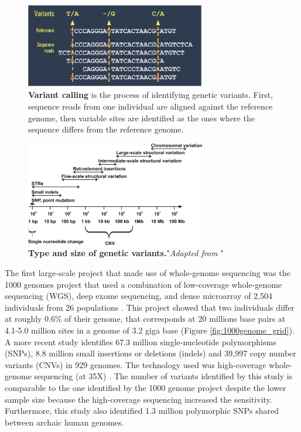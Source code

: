 \begin{figure}[H]
\centering
\includegraphics[width=0.7\textwidth]{fig/variantCalling.png}
\decoRule
\caption{\textbf{Variant calling} is the process of identifying genetic variants. First, sequence reads from one individual are aligned against the reference genome, then variable sites are identified as the ones where the sequence differs from the reference genome.} 
\label{fig:variantCalling}
\end{figure}

\begin{figure}[H]
\centering
\includegraphics[width=0.7\textwidth]{fig/typeOfVariants.jpeg}
\decoRule
\caption{\textbf{Type and size of genetic variants.}"\textit{Adapted from} \cite{pollex2007copy}"} 
\label{fig:typeOfVariants}
\end{figure}

The first large-scale project that made use of whole-genome sequencing was the 1000 genomes project that used a combination of low-coverage whole-genome sequencing (WGS), deep exome sequencing, and dense microarray of 2,504 individuals from 26 populations \cite{1000genome2015global}. 
This project showed that two individuals differ at roughly  0.6\% of their genome, that corresponds at 20 millions base pairs at 4.1-5.0 million sites in a genome of 3.2 giga base (Figure \ref{fig:1000genome_grid}).\\ 

A more recent study identifies 67.3 million single-nucleotide polymorphisms (SNPs), 8.8 million small insertions or deletions (indels) and 39,997 copy number variants (CNVs) in 929 genomes. The technology used was high-coverage whole-genome sequencing (at 35X) \cite{bergstrom2019insights}. The number of variants identified by this study is comparable to the one identified by the 1000 genome project despite the lower sample size because the high-coverage sequencing increased the sensitivity. Furthermore, this study also identified 1.3 million polymorphic SNPs shared between archaic human genomes.\\

